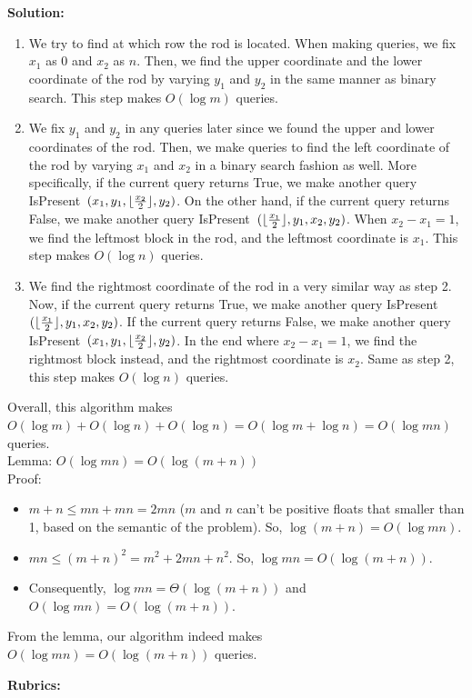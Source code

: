 \documentclass[11pt]{article}
\begin{document}
\begin{qunlist}
\textbf{Solution:}
\begin{enumerate}
    \item We try to find at which row the rod is located. When making queries, we fix $x_1$ as $0$ and $x_2$ as $n$. Then, we find the upper coordinate and the lower coordinate of the rod by varying $y_1$ and $y_2$ in the same manner as binary search. This step makes $O(\log m)$ queries.
    \item We fix $y_1$ and $y_2$ in any queries later since we found the upper and lower coordinates of the rod. Then, we make queries to find the left coordinate of the rod by varying $x_1$ and $x_2$ in a binary search fashion as well. More specifically, if the current query returns True, we make another query IsPresent~$(x_1,y_1,\lfloor \frac{x_2}{2} \rfloor,y_2)$. On the other hand, if the current query returns False, we make another query IsPresent~$(\lfloor \frac{x_1}{2} \rfloor,y_1,x_2,y_2)$. When $x_2 - x_1 = 1$, we find the leftmost block in the rod, and the leftmost coordinate is $x_1$. This step makes $O(\log n)$ queries.
    \item We find the rightmost coordinate of the rod in a very similar way as step 2. Now, if the current query returns True, we make another query IsPresent~$(\lfloor \frac{x_1}{2} \rfloor,y_1,x_2,y_2)$. If the current query returns False, we make another query IsPresent~$(x_1,y_1,\lfloor \frac{x_2}{2} \rfloor,y_2)$. In the end where $x_2 - x_1 = 1$, we find the rightmost block instead, and the rightmost coordinate is $x_2$. Same as step 2, this step makes $O(\log n)$ queries.
\end{enumerate}
Overall, this algorithm makes $O(\log m) + O(\log n) + O(\log n) = O(\log m + \log n) = O(\log mn)$ queries.\\
Lemma: $O(\log mn) = O(\log (m + n))$\\
Proof:
\begin{itemize}
    \item $m + n \le mn + mn = 2mn$ ($m$ and $n$ can't be positive floats that smaller than 1, based on the semantic of the problem). So, $\log (m + n) = O(\log mn)$.
    \item $mn \le {(m + n)}^2 = m^2 + 2mn + n^2$. So, $\log mn = O(\log (m + n))$.
    \item Consequently, $\log mn = \Theta(\log (m + n))$ and $O(\log mn) = O(\log (m + n))$.
\end{itemize}
From the lemma, our algorithm indeed makes $O(\log mn) = O(\log (m + n))$ queries.

\newpage
{\huge {\bf Rubrics:}}


\end{qunlist}
\end{document}
